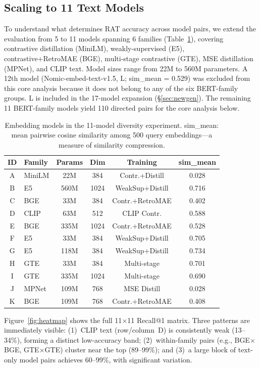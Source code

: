 \documentclass{article}
\begin{document}
\subsection{Scaling to 11 Text Models}
\label{sec:matrix}

To understand what determines RAT accuracy across model pairs, we extend the evaluation from 5 to 11 models spanning 6 families (Table~\ref{tab:models}), covering contrastive distillation (MiniLM), weakly-supervised (E5), contrastive+RetroMAE (BGE), multi-stage contrastive (GTE), MSE distillation (MPNet), and CLIP text. Model sizes range from 22M to 560M parameters. A 12th model (Nomic-embed-text-v1.5, L; sim\_mean = 0.529) was excluded from this core analysis because it does not belong to any of the six BERT-family groups. L is included in the 17-model expansion (\S\ref{sec:newgen}). The remaining 11 BERT-family models yield 110 directed pairs for the core analysis below.

\begin{table}[t]
\centering
\caption{Embedding models in the 11-model diversity experiment. sim\_mean: mean pairwise cosine similarity among 500 query embeddings---a measure of similarity compression.}
\label{tab:models}
\small
\begin{tabular}{clcccc}
\toprule
ID & Family & Params & Dim & Training & sim\_mean \\
\midrule
A & MiniLM & 22M & 384 & Contr.+Distill & 0.028 \\
B & E5 & 560M & 1024 & WeakSup+Distill & 0.716 \\
C & BGE & 33M & 384 & Contr.+RetroMAE & 0.402 \\
D & CLIP & 63M & 512 & CLIP Contr. & 0.588 \\
E & BGE & 335M & 1024 & Contr.+RetroMAE & 0.528 \\
F & E5 & 33M & 384 & WeakSup+Distill & 0.705 \\
G & E5 & 118M & 384 & WeakSup+Distill & 0.734 \\
H & GTE & 33M & 384 & Multi-stage & 0.701 \\
I & GTE & 335M & 1024 & Multi-stage & 0.690 \\
J & MPNet & 109M & 768 & MSE Distill & 0.028 \\
K & BGE & 109M & 768 & Contr.+RetroMAE & 0.408 \\
\bottomrule
\end{tabular}
\end{table}

Figure~\ref{fig:heatmap} shows the full 11$\times$11 Recall@1 matrix. Three patterns are immediately visible: (1)~CLIP text (row/column~D) is consistently weak (13--34\%), forming a distinct low-accuracy band; (2)~within-family pairs (e.g., BGE$\times$BGE, GTE$\times$GTE) cluster near the top (89--99\%); and (3)~a large block of text-only model pairs achieves 60--99\%, with significant variation.
\end{document}
